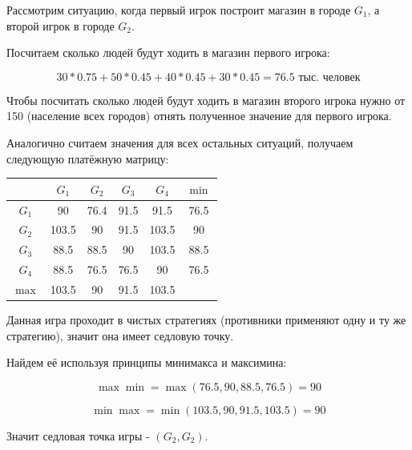 \documentclass[9pt, a4paper]{article}
\begin{document}
    Рассмотрим ситуацию, когда первый игрок построит магазин в городе $G_1$,
    а второй игрок в городе $G_2$.

    Посчитаем сколько людей будут ходить в магазин первого игрока:

    \begin{equation}
        30 * 0.75 + 50 * 0.45 + 40 * 0.45 + 30 * 0.45 = 76.5\label{eq:equation9}
        \text{ тыс. человек}
    \end{equation}

    Чтобы посчитать сколько людей будут ходить в магазин второго игрока нужно от 150 (население всех городов)
    отнять полученное значение для первого игрока.

    Аналогично считаем значения для всех остальных ситуаций, получаем следующую платёжную матрицу:
    \begin{table}[h]
        \centering
        \begin{tabular}{|c|c|c|c|c|c|}
            \hline        & $G_1$ & $G_2$ & $G_3$ & $G_4$ & $\min$ \\
            \hline $G_1$  & 90    & 76.4  & 91.5  & 91.5  & 76.5   \\
            \hline $G_2$  & 103.5 & 90    & 91.5  & 103.5 & 90     \\
            \hline $G_3$  & 88.5  & 88.5  & 90    & 103.5 & 88.5   \\
            \hline $G_4$  & 88.5  & 76.5  & 76.5  & 90    & 76.5   \\
            \hline $\max$ & 103.5 & 90    & 91.5  & 103.5 &        \\
            \hline
        \end{tabular}\label{tab:table}
    \end{table}

    Данная игра проходит в чистых стратегиях (противники применяют одну и ту же стратегию), значит она имеет седловую точку.

    Найдем её используя принципы минимакса и максимина:

    \begin{equation}
        \max\min = \max(76.5, 90, 88.5, 76.5) = 90\label{eq:equation10}
    \end{equation}

    \begin{equation}
        \min\max = \min(103.5, 90, 91.5, 103.5) = 90\label{eq:equation11}
    \end{equation}

    Значит седловая точка игры - $(G_2, G_2)$.
\end{document}
